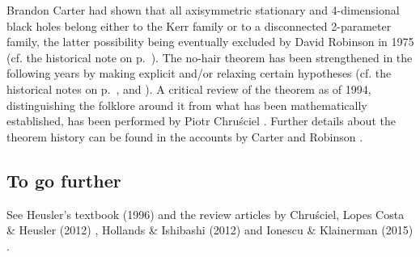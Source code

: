 \begin{hist}
Brandon Carter \cite{Carte71} had shown
that all axisymmetric stationary and 4-dimensional black holes belong either to the
Kerr family or to a disconnected 2-parameter family, the latter possibility
being eventually excluded
by David Robinson in 1975 \cite{Robin75}
(cf. the historical note on p.~\pageref{h:sta:axisym_uniqueness}).
The no-hair theorem has been strengthened in the following years by making explicit
and/or relaxing certain hypotheses (cf. the historical notes on p.~\pageref{h:sta:Israel_thm_vacuum},
\pageref{h:sta:Israel_thm_electrovac} and \pageref{h:sta:axisym_uniqueness}).
A critical review of the theorem as of 1994, distinguishing the folklore around it from what has been mathematically established, has been performed by
Piotr Chru\'sciel \cite{Chrus94}.
Further details about the theorem history can be found in the accounts by Carter \cite{Carte99} and Robinson \cite{Robin09}.
\end{hist}


\subsection{To go further}

See Heusler's textbook (1996) \cite{Heusl96} and the review
articles by Chru\'sciel, Lopes Costa \& Heusler (2012) \cite{ChrusLH12},
Hollands \& Ishibashi (2012) \cite{HollaI12} and
Ionescu \& Klainerman (2015) \cite{IonesK15}.

